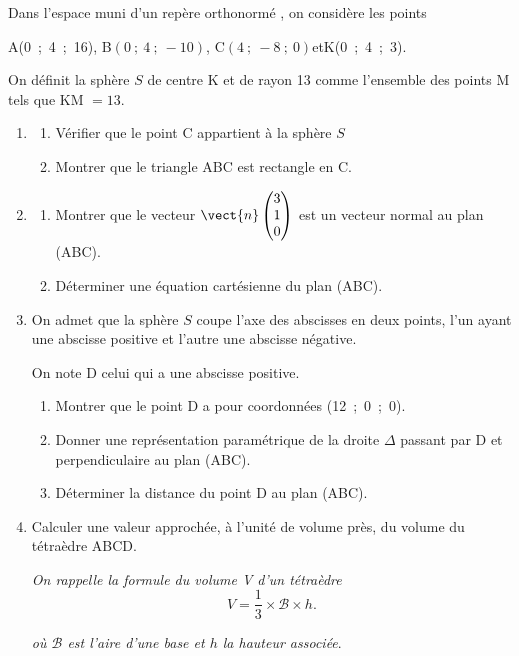 \medskip

Dans l'espace muni d'un repère orthonormé \Oijk, on considère les points 
\begin{center}A(0~;~4~;~16), \quad B$(0~;~4~;~- 10)$, \quad C$(4~;~-8~;~0)$\quad et\quad  K(0~;~4~;~3).\end{center}

On définit la sphère $S$ de centre K et de rayon 13 comme l'ensemble des points M tels que KM $= 13$.

\medskip

\begin{enumerate}
\item 
	\begin{enumerate}
		\item Vérifier que le point C appartient à la sphère $S$
		\item Montrer que le triangle ABC est rectangle en C.
	\end{enumerate}
\item 
	\begin{enumerate}
		\item Montrer que le vecteur $\vect{n}\begin{pmatrix}3\\1\\0\end{pmatrix}$ est un vecteur normal au plan (ABC).
		\item Déterminer une équation cartésienne du plan (ABC).
	\end{enumerate}
\item On admet que la sphère $S$ coupe l'axe des abscisses en deux points, l'un ayant une abscisse positive et l'autre une abscisse négative.

On note D celui qui a une abscisse positive.
	\begin{enumerate}
		\item Montrer que le point D a pour coordonnées (12~;~0~;~0).
		\item Donner une représentation paramétrique de la droite $\Delta$ passant par D et perpendiculaire au plan (ABC).
		\item  Déterminer la distance du point D au plan (ABC).
	\end{enumerate}
\item Calculer une valeur approchée, à l'unité de volume près, du volume du tétraèdre ABCD.

\emph{On rappelle la formule du volume V d'un tétraèdre}
\[V = \dfrac13 \times \mathcal{B} \times h.\]

\emph{où $\mathcal{B}$ est l'aire d'une base et $h$ la hauteur associée}.
\end{enumerate}

\bigskip
